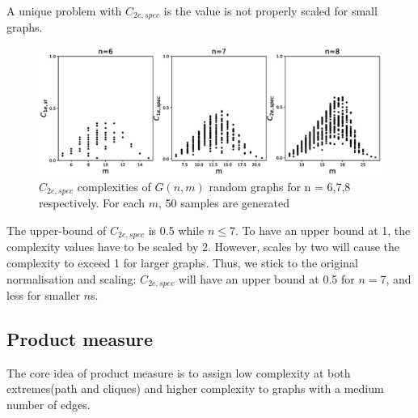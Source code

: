 \documentclass[12pt]{article}
\begin{document}
\par
A unique problem with $C_{2e,spec}$ is the value is not properly scaled for small graphs.

\begin{figure}[ht]
    \includegraphics[width = \textwidth]{c2espec.eps}
    \caption{$C_{2e,spec}$ complexities of $G(n,m)$ random graphs for n = 6,7,8 respectively. For each $m$, 50 samples are generated}
    \label{fig:c2espec}
    \centering
\end{figure}
\par
The upper-bound of $C_{2e,spec}$ is 0.5 while $ n\leq7 $. To have an upper bound at 1, the complexity values have to be scaled by 2. However, scales by two will cause the complexity to exceed 1 for larger graphs. Thus, we stick to the original normalisation and scaling: $C_{2e,spec}$ will have an upper bound at 0.5 for $n=7$, and less for smaller $n$s.

\subsection{Product measure}
The core idea of product measure is to assign low complexity at both extremes(path and cliques) and higher complexity to graphs with a medium number of edges.
\end{document}
